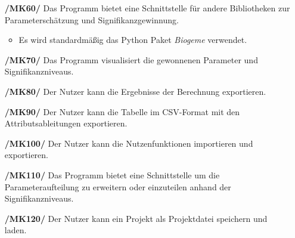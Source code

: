 \documentclass{article}
\begin{document}
\begin{itemize}
    \item[\textbf{/MK60/}] Das Programm bietet eine Schnittstelle für andere Bibliotheken zur Parameterschätzung und Signifikanzgewinnung. 
    \begin{itemize}
        \item Es wird standardmäßig das Python Paket \textit{Biogeme} verwendet.
    \end{itemize}
    \item[\textbf{/MK70/}] Das Programm visualisiert die gewonnenen Parameter und Signifikanzniveaus.
    \item[\textbf{/MK80/}] Der Nutzer kann die Ergebnisse der Berechnung  exportieren.
    \item[\textbf{/MK90/}] Der Nutzer kann die Tabelle im CSV-Format mit den Attributsableitungen exportieren.
    \item[\textbf{/MK100/}] Der Nutzer kann die Nutzenfunktionen importieren und exportieren.
    \item[\textbf{/MK110/}] Das Programm bietet eine Schnittstelle um die Parameteraufteilung zu erweitern oder einzuteilen anhand der Signifikanzniveaus.
    \item[\textbf{/MK120/}] Der Nutzer kann ein Projekt als Projektdatei speichern und laden.
\end{itemize}
\end{document}
